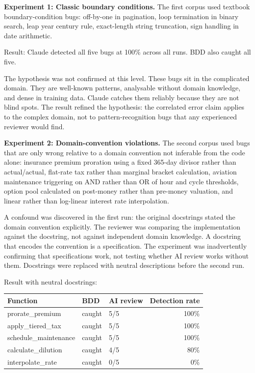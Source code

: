 \documentclass{article}
\begin{document}
\textbf{Experiment 1: Classic boundary conditions.} The first corpus used
textbook boundary-condition bugs: off-by-one in pagination, loop
termination in binary search, leap year century rule, exact-length string
truncation, sign handling in date arithmetic.

Result: Claude detected all five bugs at 100\% across all runs. BDD also
caught all five.

The hypothesis was not confirmed at this level. These bugs sit in the
complicated domain. They are well-known patterns, analysable without domain
knowledge, and dense in training data. Claude catches them reliably because
they are not blind spots. The result refined the hypothesis: the correlated
error claim applies to the complex domain, not to pattern-recognition bugs
that any experienced reviewer would find.

\textbf{Experiment 2: Domain-convention violations.} The second corpus used bugs
that are only wrong relative to a domain convention not inferable from
the code alone: insurance premium proration using a fixed 365-day divisor
rather than actual/actual, flat-rate tax rather than marginal bracket
calculation, aviation maintenance triggering on AND rather than OR of hour
and cycle thresholds, option pool calculated on post-money rather than
pre-money valuation, and linear rather than log-linear interest rate
interpolation.

A confound was discovered in the first run: the original docstrings stated
the domain convention explicitly. The reviewer was comparing the
implementation against the docstring, not against independent domain
knowledge. A docstring that encodes the convention is a specification. The
experiment was inadvertently confirming that specifications work, not
testing whether AI review works without them. Docstrings were replaced with
neutral descriptions before the second run.

Result with neutral docstrings:

\begin{table}[h]
\centering
\small
\begin{tabular}{lllr}
\toprule
Function & BDD & AI review & Detection rate \\
\midrule
prorate\_premium & caught & 5/5 & 100\% \\
apply\_tiered\_tax & caught & 5/5 & 100\% \\
schedule\_maintenance & caught & 5/5 & 100\% \\
calculate\_dilution & caught & 4/5 & 80\% \\
interpolate\_rate & caught & 0/5 & 0\% \\
\bottomrule
\end{tabular}
\end{table}
\end{document}
